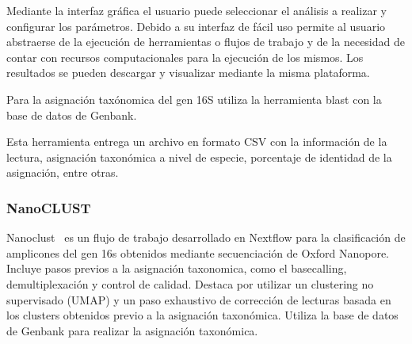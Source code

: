 Mediante la interfaz gráfica el usuario puede seleccionar el análisis a realizar y configurar los parámetros. Debido a su interfaz de fácil uso permite al usuario abstraerse de la ejecución de herramientas o flujos de trabajo y de la necesidad de contar con recursos computacionales para la ejecución de los mismos.
Los resultados se pueden descargar y visualizar mediante la misma plataforma.


Para la asignación taxónomica del gen 16S utiliza la herramienta blast con la base de datos de Genbank.

Esta herramienta entrega un archivo en formato CSV con la información de la lectura, asignación taxonómica a nivel de especie, porcentaje de identidad de la asignación, entre otras.
\subsubsection{NanoCLUST}
Nanoclust~\cite{10.1093/bioinformatics/btaa900} es un flujo de trabajo desarrollado en Nextflow para la clasificación de amplicones del gen 16s obtenidos mediante secuenciación de Oxford Nanopore. Incluye pasos previos a la asignación taxonomica, como el basecalling, demultiplexación y control de calidad. Destaca por utilizar un clustering no supervisado (UMAP) y un paso exhaustivo de corrección de lecturas basada en los clusters obtenidos previo a la asignación taxonómica.
Utiliza la base de datos de Genbank para realizar la asignación taxonómica.

